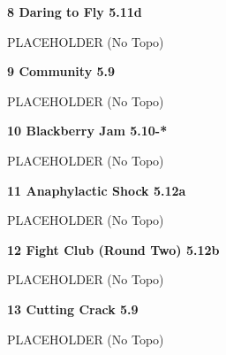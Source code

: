 \begin{multicols}{2}
			
			
			\needspace{1.5cm}
\label{rt:Daring to Fly}
\colorbox{RoyalBlue!20}{
\parbox{0.95\linewidth}{
\textbf{
8 Daring to Fly 5.11d  
}}}

			\begin{adjustwidth}{0.5cm}{}			
			PLACEHOLDER (No Topo)
			\end{adjustwidth}
			
			
			
			\needspace{1.5cm}
\label{rt:Community}
\colorbox{green!20}{
\parbox{0.95\linewidth}{
\textbf{
9 Community 5.9  
}}}

			\begin{adjustwidth}{0.5cm}{}			
			PLACEHOLDER (No Topo)
			\end{adjustwidth}
			
			
			
			\needspace{1.5cm}
\label{rt:Blackberry Jam}
\colorbox{RoyalBlue!20}{
\parbox{0.95\linewidth}{
\textbf{
10 Blackberry Jam 5.10-*  
}}}

			\begin{adjustwidth}{0.5cm}{}			
			PLACEHOLDER (No Topo)
			\end{adjustwidth}
			
			
			
			\needspace{1.5cm}
\label{rt:Anaphylactic Shock}
\colorbox{Goldenrod!50}{
\parbox{0.95\linewidth}{
\textbf{
11 Anaphylactic Shock 5.12a  
}}}

			\begin{adjustwidth}{0.5cm}{}			
			PLACEHOLDER (No Topo)
			\end{adjustwidth}
			
			
			
			\needspace{1.5cm}
\label{rt:Fight Club (Round Two)}
\colorbox{Goldenrod!50}{
\parbox{0.95\linewidth}{
\textbf{
12 Fight Club (Round Two) 5.12b  
}}}

			\begin{adjustwidth}{0.5cm}{}			
			PLACEHOLDER (No Topo)
			\end{adjustwidth}
			
			
			
			\needspace{1.5cm}
\label{rt:Cutting Crack}
\colorbox{green!20}{
\parbox{0.95\linewidth}{
\textbf{
13 Cutting Crack 5.9  
}}}

			\begin{adjustwidth}{0.5cm}{}			
			PLACEHOLDER (No Topo)
			\end{adjustwidth}
			

\end{multicols}
